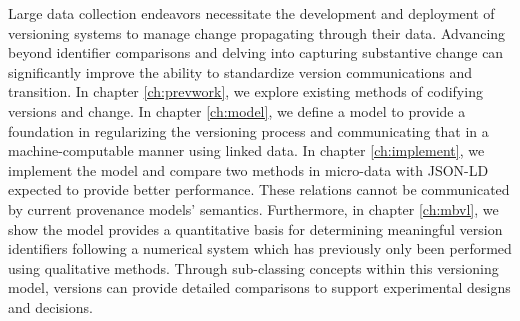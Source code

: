 Large data collection endeavors necessitate the development and deployment of versioning systems to manage change propagating through their data.
Advancing beyond identifier comparisons and delving into capturing substantive change can significantly improve the ability to standardize version communications and transition.
In chapter \ref{ch:prevwork}, we explore existing methods of codifying versions and change.
In chapter \ref{ch:model}, we define a model to provide a foundation in regularizing the versioning process and communicating that in a machine-computable manner using linked data.
In chapter \ref{ch:implement}, we implement the model and compare two methods in micro-data with JSON-LD expected to provide better performance.
These relations cannot be communicated by current provenance models' semantics.
Furthermore, in chapter \ref{ch:mbvl}, we show the model provides a quantitative basis for determining meaningful version identifiers following a numerical system which has previously only been performed using qualitative methods.
Through sub-classing concepts within this versioning model, versions can provide detailed comparisons to support experimental designs and decisions.


